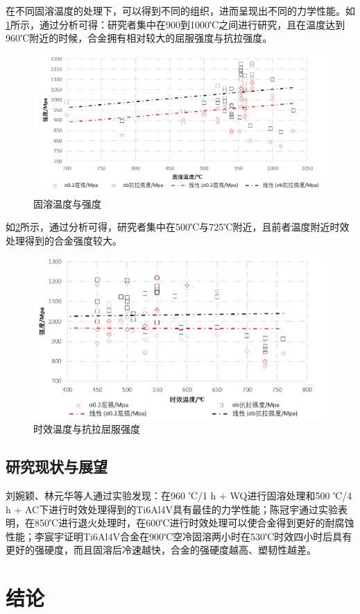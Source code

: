\documentclass[
class = book,
zihao = -4,
font = noto,
paper = a4paper,
openany
]{easybook}
\newcommand{\ti}{Ti6Al4V}
\begin{document}
在不同固溶温度的处理下，可以得到不同的组织，进而呈现出不同的力学性能。如\ref{fig:固溶温度与强度}所示，通过分析可得：研究者集中在900到1000℃之间进行研究，且在温度达到960℃附近的时候，合金拥有相对较大的屈服强度与抗拉强度。

\begin{figure}[h!]
	\centering
	\includegraphics[width=0.7\linewidth]{固溶温度与强度}
	\caption{固溶温度与强度}
	\label{fig:固溶温度与强度}
\end{figure}

如\ref{fig:时效温度与抗拉屈服强度}所示，通过分析可得，研究者集中在500℃与725℃附近，且前者温度附近时效处理得到的合金强度较大。
\begin{figure}[h!]
	\centering
	\includegraphics[width=0.7\linewidth]{时效温度与强度}
	\caption{时效温度与抗拉屈服强度}
	\label{fig:时效温度与抗拉屈服强度}
\end{figure}

\section{研究现状与展望}
 刘婉颖、林元华等人通过实验发现：在960 ℃/1 h + WQ进行固溶处理和500 ℃/4 h + AC下进行时效处理得到的\ti 具有最佳的力学性能\cite{LiuWanYingBuTongReChuLiGongYiDuiTi6Al4VTaiHeJinWeiGuanJieGouHeLiXueXingNengYingXiangYingWen2017}；陈冠宇通过实验表明，在850℃进行退火处理时，在600℃进行时效处理可以使合金得到更好的耐腐蚀性能\cite{1200}；李宸宇证明\ti 合金在900℃空冷固溶两小时在530℃时效四小时后具有更好的强硬度，而且固溶后冷速越快，合金的强硬度越高、塑韧性越差\cite{900}。%
\chapter{结论}




	\backmatter
	\listoffigures
	\listoftables
	\clearpage
	
\end{document}
